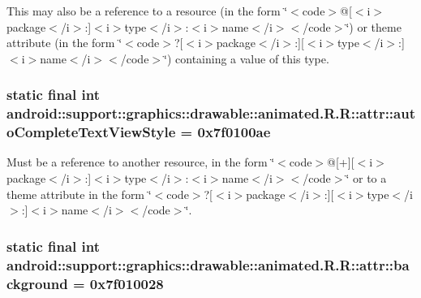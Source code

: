 This may also be a reference to a resource (in the form \char`\"{}$<$code$>$@\mbox{[}$<$i$>$package$<$/i$>$:\mbox{]}$<$i$>$type$<$/i$>$:$<$i$>$name$<$/i$>$$<$/code$>$\char`\"{}) or theme attribute (in the form \char`\"{}$<$code$>$?\mbox{[}$<$i$>$package$<$/i$>$:\mbox{]}\mbox{[}$<$i$>$type$<$/i$>$:\mbox{]}$<$i$>$name$<$/i$>$$<$/code$>$\char`\"{}) containing a value of this type. \hypertarget{classandroid_1_1support_1_1graphics_1_1drawable_1_1animated_1_1_r_1_1attr_ba0ff3ef1eca9052d07d217d3f62db8f}{
\subsubsection[{autoCompleteTextViewStyle}]{\setlength{\rightskip}{0pt plus 5cm}static final int android::support::graphics::drawable::animated.R.R::attr::autoCompleteTextViewStyle = 0x7f0100ae}}
\label{classandroid_1_1support_1_1graphics_1_1drawable_1_1animated_1_1_r_1_1attr_ba0ff3ef1eca9052d07d217d3f62db8f}


Must be a reference to another resource, in the form \char`\"{}$<$code$>$@\mbox{[}+\mbox{]}\mbox{[}$<$i$>$package$<$/i$>$:\mbox{]}$<$i$>$type$<$/i$>$:$<$i$>$name$<$/i$>$$<$/code$>$\char`\"{} or to a theme attribute in the form \char`\"{}$<$code$>$?\mbox{[}$<$i$>$package$<$/i$>$:\mbox{]}\mbox{[}$<$i$>$type$<$/i$>$:\mbox{]}$<$i$>$name$<$/i$>$$<$/code$>$\char`\"{}. \hypertarget{classandroid_1_1support_1_1graphics_1_1drawable_1_1animated_1_1_r_1_1attr_31244c889efe0054b4cf6a99932a8e9d}{
\subsubsection[{background}]{\setlength{\rightskip}{0pt plus 5cm}static final int android::support::graphics::drawable::animated.R.R::attr::background = 0x7f010028}}
\label{classandroid_1_1support_1_1graphics_1_1drawable_1_1animated_1_1_r_1_1attr_31244c889efe0054b4cf6a99932a8e9d}



